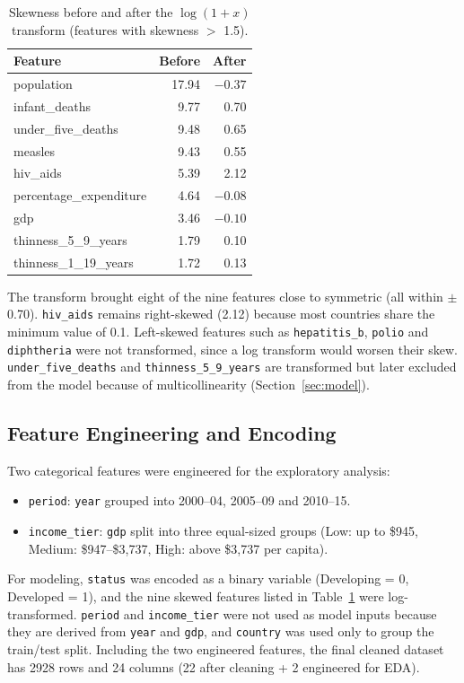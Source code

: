 \documentclass[12pt,a4paper]{article}
\begin{document}
\begin{table}[H]\centering
\caption{Skewness before and after the $\log(1+x)$ transform (features with skewness $>$ 1.5).}\label{tab:skew}
\begin{tabular}{lrr}\toprule
\textbf{Feature} & \textbf{Before} & \textbf{After}\\\midrule
population & 17.94 & $-0.37$\\
infant\_deaths & 9.77 & 0.70\\
under\_five\_deaths & 9.48 & 0.65\\
measles & 9.43 & 0.55\\
hiv\_aids & 5.39 & 2.12\\
percentage\_expenditure & 4.64 & $-0.08$\\
gdp & 3.46 & $-0.10$\\
thinness\_5\_9\_years & 1.79 & 0.10\\
thinness\_1\_19\_years & 1.72 & 0.13\\\bottomrule
\end{tabular}\end{table}

The transform brought eight of the nine features close to symmetric (all within $\pm$0.70).
\texttt{hiv\_aids} remains right-skewed (2.12) because most countries share the
minimum value of 0.1. Left-skewed features such as \texttt{hepatitis\_b}, \texttt{polio}
and \texttt{diphtheria} were not transformed, since a log transform would worsen their skew.
\texttt{under\_five\_deaths} and \texttt{thinness\_5\_9\_years} are transformed but later
excluded from the model because of multicollinearity (Section~\ref{sec:model}).

\subsection{Feature Engineering and Encoding}
Two categorical features were engineered for the exploratory analysis:
\begin{itemize}
  \item \texttt{period}: \texttt{year} grouped into 2000--04, 2005--09 and 2010--15.
  \item \texttt{income\_tier}: \texttt{gdp} split into three equal-sized groups
        (Low: up to \$945, Medium: \$947--\$3,737, High: above \$3,737 per capita).
\end{itemize}
For modeling, \texttt{status} was encoded as a binary variable (Developing = 0, Developed = 1),
and the nine skewed features listed in Table~\ref{tab:skew} were log-transformed.
\texttt{period} and \texttt{income\_tier} were not used as model inputs because they
are derived from \texttt{year} and \texttt{gdp}, and \texttt{country} was used only to
group the train/test split. Including the two engineered features, the final cleaned dataset has
2928 rows and 24 columns (22 after cleaning + 2 engineered for EDA).
\end{document}

